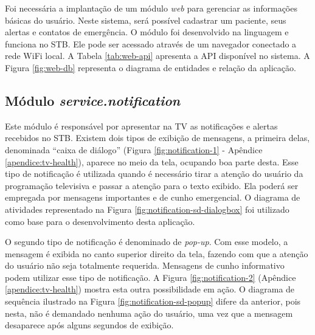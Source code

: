Foi necessária a implantação de um módulo \textit{web} para gerenciar as 
informações básicas do usuário. Neste sistema, será possível cadastrar um 
paciente, seus alertas e contatos de emergência. O módulo \web[] foi desenvolvido
na linguagem \python[] e funciona no STB. Ele pode ser acessado através de
um navegador conectado a rede WiFi local. A Tabela \ref{tab:web-api} apresenta
a API disponível no sistema. A Figura \vref{fig:web-db} representa o diagrama
de entidades e relação da aplicação.


\subsection{Módulo \textit{service.notification}}\label{subsubsec:notification}

Este módulo é responsável por apresentar na TV as notificações e alertas
recebidos no STB. Existem dois tipos de exibição de mensagens, a primeira
delas, denominada ``caixa de diálogo'' (Figura \vref{fig:notification-1} -
Apêndice \ref{apendice:tv-health}), aparece no meio da tela, ocupando boa parte
desta.  Esse tipo de notificação é utilizada quando é necessário tirar a
atenção do usuário da programação televisiva e passar a atenção para o texto
exibido.  Ela poderá ser empregada por mensagens importantes e de cunho
emergencial.  O diagrama de atividades representado na Figura
\ref{fig:notification-sd-dialogbox} foi utilizado como base para o
desenvolvimento desta aplicação.



O segundo tipo de notificação é denominado de \textit{pop-up}. Com esse modelo,
a mensagem é exibida no canto superior direito da tela, fazendo com que a
atenção do usuário não seja totalmente requerida. Mensagens de cunho informativo
podem utilizar esse tipo de notificação. A Figura \ref{fig:notification-2} 
(Apêndice \ref{apendice:tv-health}) mostra esta outra possibilidade em ação.
O diagrama de sequência ilustrado na Figura \ref{fig:notification-sd-popup}
difere da anterior, pois nesta, não é demandado nenhuma
ação do usuário, uma vez que a mensagem desaparece após alguns segundos de exibição.

